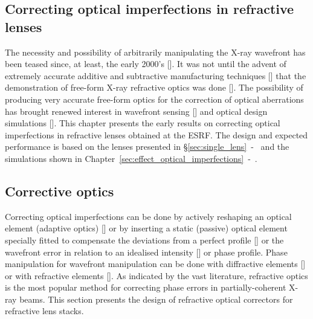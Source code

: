 \begin{refsection}
\chapter{Correcting optical imperfections in refractive lenses}\label{sec:corrections}

The necessity and possibility of arbitrarily manipulating the X-ray wavefront has been teased since, at least, the early 2000's [\cite{Chubar1999, Chubar2001b}]. It was not until the advent of extremely accurate additive and subtractive manufacturing techniques [\cite{Stohr2015, Polikarpov2016, Petrov2017, Roth2018, Sanli2018, Seiboth2019, Abrashitova2020, Antipov2020, Lin2020, Medvedskaya2020}] that the demonstration of free-form X-ray refractive optics was done [\cite{Sawhney2016,Seiboth2017,Laundy2019, Seiboth2020, Dhamgaye2020}]. The possibility of producing very accurate free-form optics for the correction of optical aberrations has brought renewed interest in wavefront sensing [\cite{Berujon2015, Seaberg2019}] and optical design simulations [\cite{Laundy2020}]. This chapter presents the early results on correcting optical imperfections in refractive lenses obtained at the ESRF. The design and expected performance is based on the lenses presented in \S\ref{sec:single_lens}~-~\textit{} and the simulations shown in Chapter~\ref{sec:effect_optical_imperfections}~-~\textit{}.

\section{Corrective optics}\label{sec:corrective_optics}

Correcting optical imperfections can be done by actively reshaping an optical element (adaptive optics) [\cite{Sutter2012, Alcock2013}] or by inserting a static (passive) optical element specially fitted to compensate the deviations from a perfect profile [\cite{Morawe2019}] or the wavefront error in relation to an idealised intensity [\cite{Donato2020}] or phase profile. Phase manipulation for wavefront manipulation can be done with diffractive elements [\cite{Probst2020}] or with refractive elements [\cite{Sawhney2016,Seiboth2017,Laundy2019,Seiboth2020, Dhamgaye2020}]. As indicated by the vast literature, refractive optics is the most popular method for correcting phase errors in partially-coherent X-ray beams. This section presents the design of refractive optical correctors for refractive lens stacks.


\end{refsection}
